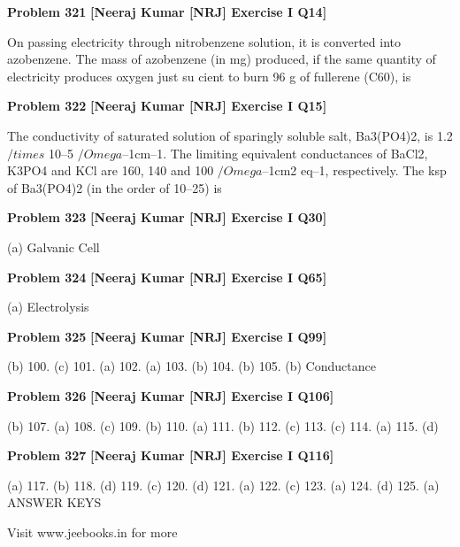 \begin{problembox}
\textbf{Problem 321} \hfill \textbf{[Neeraj Kumar [NRJ] Exercise I Q14]}
\label{q:ext-nrj_all_questions-321}

On passing electricity through nitrobenzene 
solution, it is converted into azobenzene. The 
mass of azobenzene (in mg) produced, if the 
same quantity of electricity produces oxygen just 
su   cient to burn 96 g of fullerene (C60), is
\end{problembox}

\begin{problembox}
\textbf{Problem 322} \hfill \textbf{[Neeraj Kumar [NRJ] Exercise I Q15]}
\label{q:ext-nrj_all_questions-322}

The conductivity of saturated solution of 
sparingly soluble salt, Ba3(PO4)2, is 1.2 $/times$ 10--5 
$/Omega$--1cm--1. The limiting equivalent conductances 
of BaCl2, K3PO4 and KCl are 160, 140 and 100 
$/Omega$--1cm2
 eq--1, respectively. The ksp of Ba3(PO4)2 
(in the order of 10--25) is
\end{problembox}

\begin{problembox}
\textbf{Problem 323} \hfill \textbf{[Neeraj Kumar [NRJ] Exercise I Q30]}
\label{q:ext-nrj_all_questions-323}

(a)
Galvanic Cell
\end{problembox}

\begin{problembox}
\textbf{Problem 324} \hfill \textbf{[Neeraj Kumar [NRJ] Exercise I Q65]}
\label{q:ext-nrj_all_questions-324}

(a)
Electrolysis
\end{problembox}

\begin{problembox}
\textbf{Problem 325} \hfill \textbf{[Neeraj Kumar [NRJ] Exercise I Q99]}
\label{q:ext-nrj_all_questions-325}

(b) 100. (c) 101. (a) 102. (a) 103. (b) 104. (b) 105. (b)
Conductance
\end{problembox}

\begin{problembox}
\textbf{Problem 326} \hfill \textbf{[Neeraj Kumar [NRJ] Exercise I Q106]}
\label{q:ext-nrj_all_questions-326}

(b) 107. (a) 108. (c) 109. (b) 110. (a) 111. (b) 112. (c) 113. (c) 114. (a) 115. (d)
\end{problembox}

\begin{problembox}
\textbf{Problem 327} \hfill \textbf{[Neeraj Kumar [NRJ] Exercise I Q116]}
\label{q:ext-nrj_all_questions-327}

(a) 117. (b) 118. (d) 119. (c) 120. (d) 121. (a) 122. (c) 123. (a) 124. (d) 125. (a)
ANSWER KEYS
 
 
Visit www.jeebooks.in for more
\end{problembox}

